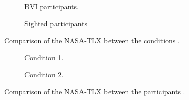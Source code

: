 \begin{figure}[htbp]
    \centering
    \begin{subfigure}{.45\textwidth}
        \centering
        \resizebox{1.1\linewidth}{!}{
        
        }
        \caption{BVI participants.}
        \label{fig:bradley_2005_condition_1}
    \end{subfigure}
    \hfill
    \begin{subfigure}{.45\textwidth}
        \centering
        \resizebox{1.1\linewidth}{!}{
        
        }
        \caption{Sighted participants}
        \label{fig:bradley_2005_condition_2}
    \end{subfigure}
\caption{Comparison of the NASA-TLX between the conditions \cite{bradley2005experimental}.}
\label{fig:bradley_2005_condition}
\end{figure}



\begin{figure}[htbp]
    \centering
    \begin{subfigure}{.49\textwidth}
        \centering
        \resizebox{\linewidth}{!}{
        
        }
        \caption{Condition 1.}
        \label{fig:bradley_2005_nasa_participants_1}
    \end{subfigure}
    \hfill
    \begin{subfigure}{.49\textwidth}
        \centering
        \resizebox{\linewidth}{!}{
        
        }
        \caption{Condition 2.}
        \label{fig:bradley_2005_nasa_participants_2}
    \end{subfigure}
\caption{Comparison of the NASA-TLX between the participants \cite{bradley2005experimental}.}
\label{fig:bradley_2005_participants}
\end{figure}



